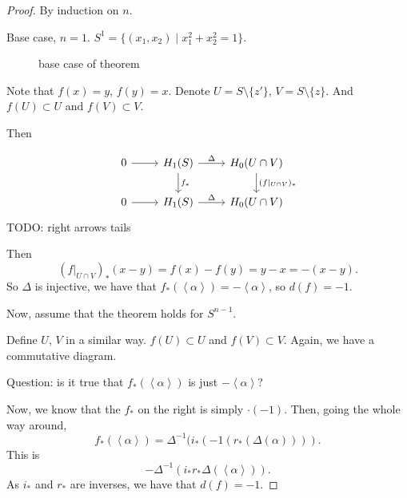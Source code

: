 \begin{proof}
    By induction on $n$.

    Base case, $n=1$.
    $S^1 = \{(x_1, x_2)  \mid  x_1^2 + x_2^2 = 1\}$.

\begin{figure}[H]
    \centering
    \caption{base case of theorem}
    \label{fig:base-case-of-theorem}
\end{figure}

Note that $f(x) = y$,  $f(y) = x$.
Denote  $U = S \setminus \{z'\} $, $V = S \setminus \{z\} $.
And $f\left(U \right) \subset U $ and $f(V) \subset V$.

Then

\[
    \begin{tikzcd}
        0 \arrow[r, ""] & H_1(S) \arrow[r, "\Delta"] \arrow[d, "f_*"]& H_0(U \cap V) \arrow[d, "(f|_{U \cap V})_*"]\\
        0 \arrow[r, ""] & H_1(S) \arrow[r, "\Delta"] & H_0(U \cap V)
    \end{tikzcd}
\]
TODO: right arrows tails

Then
\[
    (f|_{U \cap V})_* (x-y) = f(x) - f(y) = y - x =  - (x-y)
.\] 
So $\Delta$ is injective, we have that  $f_*(\left<\alpha \right>) = - \left<\alpha \right>$, so $d(f) = -1$.


\hr

Now, assume that the theorem holds for $S^{n-1}$.

Define $U$, $V$ in a similar way.
$f(U) \subset U$ and $f(V) \subset V$.
Again, we have a commutative diagram.


Question: is it true that $f_*(\left<\alpha \right>)$ is just $- \left<\alpha \right>$?

Now, we know that the $f_*$ on the right is simply $\cdot  (- 1)$.
Then, going the whole way around,
\[
    f_*(\left<\alpha \right>) = \Delta ^{-1} (i_*(-1 (r_* (\Delta(\alpha))))
.\] 
This is 
\[
    - \Delta^{-1} ( i_* r_* \Delta (\left<\alpha \right>))
.\] 
As $i_*$ and $r_*$ are inverses, we have that $d(f) = -1$.
\end{proof}



